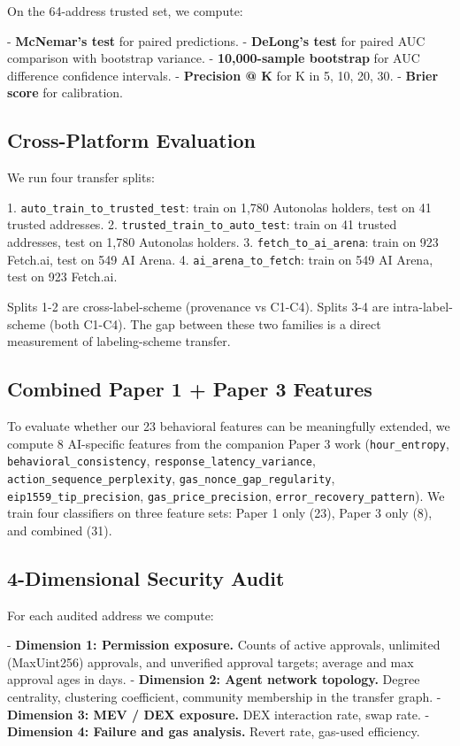 \documentclass[sigconf,nonacm=false]{acmart}
\begin{document}
On the 64-address trusted set, we compute:

- \textbf{McNemar's test} for paired predictions.
- \textbf{DeLong's test} for paired AUC comparison with bootstrap variance.
- \textbf{10,000-sample bootstrap} for AUC difference confidence intervals.
- \textbf{Precision @ K} for K in {5, 10, 20, 30}.
- \textbf{Brier score} for calibration.

\subsection{Cross-Platform Evaluation}

We run four transfer splits:

1. \texttt{auto\_train\_to\_trusted\_test}: train on 1,780 Autonolas holders, test on 41 trusted addresses.
2. \texttt{trusted\_train\_to\_auto\_test}: train on 41 trusted addresses, test on 1,780 Autonolas holders.
3. \texttt{fetch\_to\_ai\_arena}: train on 923 Fetch.ai, test on 549 AI Arena.
4. \texttt{ai\_arena\_to\_fetch}: train on 549 AI Arena, test on 923 Fetch.ai.

Splits 1-2 are cross-label-scheme (provenance vs C1-C4). Splits 3-4 are intra-label-scheme (both C1-C4). The gap between these two families is a direct measurement of labeling-scheme transfer.

\subsection{Combined Paper 1 + Paper 3 Features}

To evaluate whether our 23 behavioral features can be meaningfully extended, we compute 8 AI-specific features from the companion Paper 3 work (\texttt{hour\_entropy}, \texttt{behavioral\_consistency}, \texttt{response\_latency\_variance}, \texttt{action\_sequence\_perplexity}, \texttt{gas\_nonce\_gap\_regularity}, \texttt{eip1559\_tip\_precision}, \texttt{gas\_price\_precision}, \texttt{error\_recovery\_pattern}). We train four classifiers on three feature sets: Paper 1 only (23), Paper 3 only (8), and combined (31).

\subsection{4-Dimensional Security Audit}

For each audited address we compute:

- \textbf{Dimension 1: Permission exposure.} Counts of active approvals, unlimited (MaxUint256) approvals, and unverified approval targets; average and max approval ages in days.
- \textbf{Dimension 2: Agent network topology.} Degree centrality, clustering coefficient, community membership in the transfer graph.
- \textbf{Dimension 3: MEV / DEX exposure.} DEX interaction rate, swap rate.
- \textbf{Dimension 4: Failure and gas analysis.} Revert rate, gas-used efficiency.
\end{document}
